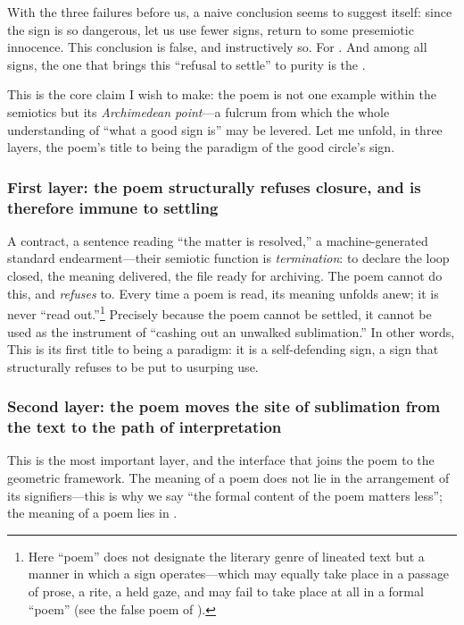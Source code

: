 With the three failures before us, a naive conclusion seems to suggest itself: since the sign is so dangerous, let us use fewer signs, return to some presemiotic innocence. This conclusion is false, and instructively so. For . And among all signs, the one that brings this ``refusal to settle'' to purity is the .

This is the core claim I wish to make: the poem is not one example within the semiotics but its \emph{Archimedean point}---a fulcrum from which the whole understanding of ``what a good sign is'' may be levered. Let me unfold, in three layers, the poem's title to being the paradigm of the good circle's sign.

\subsubsection{First layer: the poem structurally refuses closure, and is therefore immune to settling}

A contract, a sentence reading ``the matter is resolved,'' a machine-generated standard endearment---their semiotic function is \emph{termination}: to declare the loop closed, the meaning delivered, the file ready for archiving. The poem cannot do this, and \emph{refuses} to. Every time a poem is read, its meaning unfolds anew; it is never ``read out.''\footnote{Here ``poem'' does not designate the literary genre of lineated text but a manner in which a sign operates---which may equally take place in a passage of prose, a rite, a held gaze, and may fail to take place at all in a formal ``poem'' (see the false poem of ).} Precisely because the poem cannot be settled, it cannot be used as the instrument of ``cashing out an unwalked sublimation.'' In other words,  This is its first title to being a paradigm: it is a self-defending sign, a sign that structurally refuses to be put to usurping use.

\subsubsection{Second layer: the poem moves the site of sublimation from the text to the path of interpretation}

This is the most important layer, and the interface that joins the poem to the geometric framework. The meaning of a poem does not lie in the arrangement of its signifiers---this is why we say ``the formal content of the poem matters less''; the meaning of a poem lies in .

